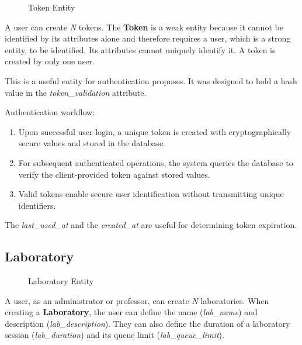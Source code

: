 \begin{figure}[H]
    \centering
    
    \caption{Token Entity}
    \label{fig:token_entity}
\end{figure}

A user can create \textit{N} tokens. The \textbf{Token} is a weak entity because it cannot be identified by its attributes alone and therefore requires a user, which is a strong entity, to be identified. Its attributes cannot uniquely identify it. A token is created by only one user.

This is a useful entity for authentication propuses. It was designed to hold a hash value in the \textit{token\_validation} attribute.

Authentication workflow:

\begin{enumerate}
    \item Upon successful user login, a unique token is created with cryptographically secure values and stored in the database.
    \item For subsequent authenticated operations, the system queries the database to verify the client-provided token against stored values.
    \item Valid tokens enable secure user identification without transmitting unique identifiers.
\end{enumerate}

The \textit{last\_used\_at} and the \textit{created\_at} are useful for determining token expiration.

\subsection*{Laboratory}

\begin{figure}[H]
    \centering
    
    \caption{Laboratory Entity}
    \label{fig:laboratory_entity}
\end{figure}

A user, as an administrator or professor, can create \textit{N} laboratories. When creating a \textbf{Laboratory}, the user can define the name (\textit{lab\_name}) and description (\textit{lab\_description}). They can also define the duration of a laboratory session (\textit{lab\_duration}) and its queue limit (\textit{lab\_queue\_limit}).

